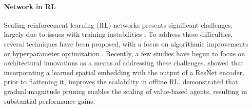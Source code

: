 \paragraph{Network  in RL}
Scaling reinforcement learning (RL) networks presents significant challenges, largely due to issues with training instabilities \citep{hessel2018rainbow}. To address these difficulties, several techniques have been proposed, with a focus on algorithmic improvements or hyperparameter optimization \citep{farebrother2022proto,farebrother24classification,taiga2022investigating, schwarzer23bbf}. Recently, a few studies have begun to focus on architectural innovations as a means of addressing these challenges. \citet{kumar2023offline} showed that incorporating a learned spatial embedding with the output of a ResNet encoder, prior to flattening it, improves the scalability in offline RL. \cite{ceron2024pruned} demonstrated that gradual magnitude pruning enables the scaling of value-based agents, resulting in substantial performance gains. %


